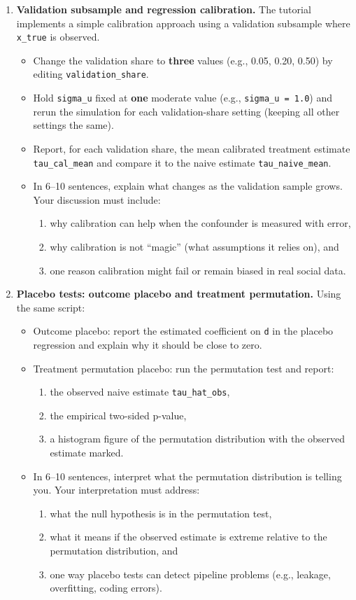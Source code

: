 \documentclass[11pt]{article}
\begin{document}
\begin{enumerate}
\item \textbf{Validation subsample and regression calibration.}
The tutorial implements a simple calibration approach using a validation subsample where \texttt{x\_true} is observed.
\begin{itemize}
  \item Change the validation share to \textbf{three} values (e.g., 0.05, 0.20, 0.50) by editing \texttt{validation\_share}.
  \item Hold \texttt{sigma\_u} fixed at \textbf{one} moderate value (e.g., \texttt{sigma\_u = 1.0}) and rerun the simulation for each validation-share setting (keeping all other settings the same).
  \item Report, for each validation share, the mean calibrated treatment estimate \texttt{tau\_cal\_mean} and compare it to the naive estimate \texttt{tau\_naive\_mean}.
  \item In 6--10 sentences, explain what changes as the validation sample grows. Your discussion must include:
  \begin{enumerate}
    \item why calibration can help when the confounder is measured with error,
    \item why calibration is not ``magic'' (what assumptions it relies on), and
    \item one reason calibration might fail or remain biased in real social data.
  \end{enumerate}
\end{itemize}

\item \textbf{Placebo tests: outcome placebo and treatment permutation.}
Using the same script:
\begin{itemize}
  \item Outcome placebo: report the estimated coefficient on \texttt{d} in the placebo regression and explain why it should be close to zero.
  \item Treatment permutation placebo: run the permutation test and report:
  \begin{enumerate}
    \item the observed naive estimate \texttt{tau\_hat\_obs},
    \item the empirical two-sided p-value,
    \item a histogram figure of the permutation distribution with the observed estimate marked.
  \end{enumerate}
  \item In 6--10 sentences, interpret what the permutation distribution is telling you. Your interpretation must address:
  \begin{enumerate}
    \item what the null hypothesis is in the permutation test,
    \item what it means if the observed estimate is extreme relative to the permutation distribution, and
    \item one way placebo tests can detect pipeline problems (e.g., leakage, overfitting, coding errors).
  \end{enumerate}
\end{itemize}


\end{enumerate}
\end{document}
